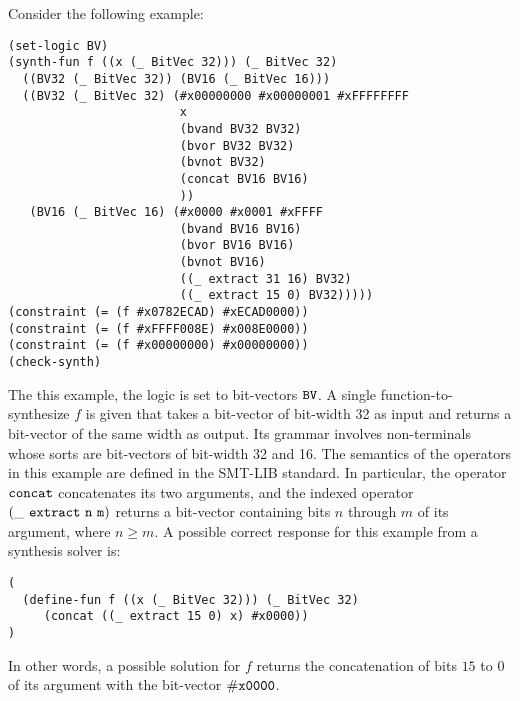 \documentclass[english,a4paper,10pt]{article}
\begin{document}
\begin{example}
Consider the following example:
\begin{lstlisting}[language=SyGuS]
(set-logic BV)
(synth-fun f ((x (_ BitVec 32))) (_ BitVec 32)
  ((BV32 (_ BitVec 32)) (BV16 (_ BitVec 16)))
  ((BV32 (_ BitVec 32) (#x00000000 #x00000001 #xFFFFFFFF
                        x
                        (bvand BV32 BV32)
                        (bvor BV32 BV32)
                        (bvnot BV32)
                        (concat BV16 BV16)
                        ))
   (BV16 (_ BitVec 16) (#x0000 #x0001 #xFFFF
                        (bvand BV16 BV16)
                        (bvor BV16 BV16)
                        (bvnot BV16)
                        ((_ extract 31 16) BV32)
                        ((_ extract 15 0) BV32)))))
(constraint (= (f #x0782ECAD) #xECAD0000))
(constraint (= (f #xFFFF008E) #x008E0000))
(constraint (= (f #x00000000) #x00000000))
(check-synth)
\end{lstlisting}
The this example, the logic is set to bit-vectors ${\tt BV}$.
A single function-to-synthesize $f$ is given that takes a
bit-vector of bit-width 32 as input and returns a bit-vector of the same width as output.
Its grammar involves non-terminals whose sorts are bit-vectors of
bit-width 32 and 16.
The semantics of the operators in this example are defined in the SMT-LIB standard.
In particular,
the operator ${\tt concat}$ concatenates its two arguments,
and the indexed operator ${\tt (\_\ extract\ n\ m)}$
returns a bit-vector containing bits $n$ through $m$ of its
argument, where $n \geq m$.
A possible correct response for this example from a synthesis solver is:
\begin{lstlisting}[language=SyGuS]
(
  (define-fun f ((x (_ BitVec 32))) (_ BitVec 32)
     (concat ((_ extract 15 0) x) #x0000))
)
\end{lstlisting}
In other words, a possible solution for $f$ 
returns the concatenation of bits $15$ to $0$ of its argument
with the bit-vector ${\tt \#x0000}$.
\end{example}
\end{document}
